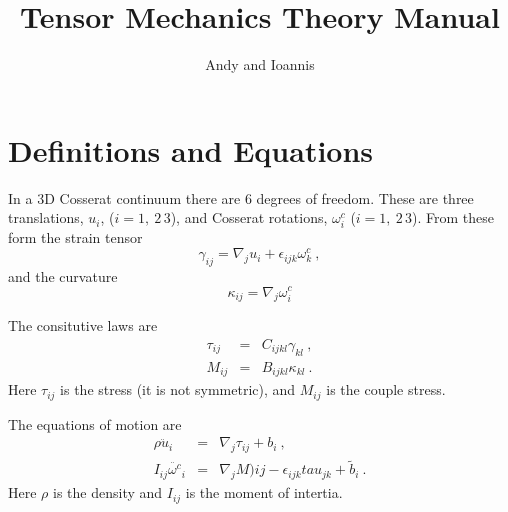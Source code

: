 \documentclass[]{scrreprt}
\begin{document}
\title{Tensor Mechanics Theory Manual}
\author{Andy and Ioannis}
\maketitle

\tableofcontents

\chapter{Definitions and Equations}

In a 3D Cosserat continuum there are 6 degrees of freedom.  These are
three translations, $u_{i}$, ($i=1,\ 2\, 3$), and Cosserat rotations,
$\omega^{c}_{i}$ ($i=1,\ 2\, 3$).   From these form the strain tensor
\begin{equation}
\gamma_{ij} = \nabla_{j}u_{i} + \epsilon_{ijk}\omega^{c}_{k} \ ,
\end{equation}
and the curvature
\begin{equation}
\kappa_{ij} = \nabla_{j}\omega^{c}_{i}
\end{equation}

The consitutive laws are
\begin{eqnarray}
\tau_{ij} & = & C_{ijkl}\gamma_{kl} \ , \\
M_{ij} & = & B_{ijkl}\kappa_{kl} \ .
\end{eqnarray}
Here $\tau_{ij}$ is the stress (it is not symmetric), and $M_{ij}$ is
the couple stress.

The equations of motion are
\begin{eqnarray}
\rho \ddot{u}_{i} & = & \nabla_{j}\tau_{ij} + b_{i} \ , \\
I_{ij}\ddot{\omega^{c}}_{i} & = & \nabla_{j}M){ij} -
\epsilon_{ijk}tau_{jk} + \tilde{b}_{i} \ .
\end{eqnarray}
Here $\rho$ is the density and $I_{ij}$ is the moment of intertia.
\end{document}

